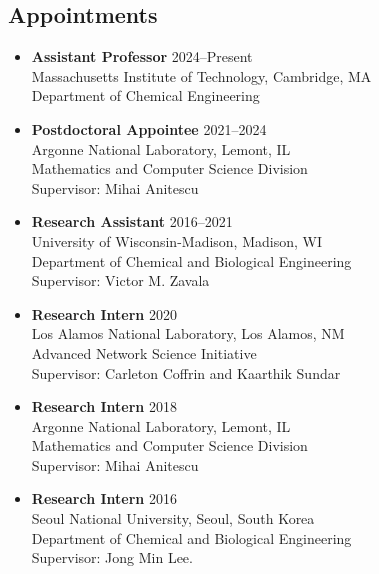 \subsection*{Appointments}
\begin{itemize}[itemsep=1pt, parsep=0pt,leftmargin=*]
\item[] {\bf Assistant Professor} \hfill 2024--Present\\
Massachusetts Institute of Technology, Cambridge, MA\\
Department of Chemical Engineering
\item[] {\bf Postdoctoral Appointee} \hfill 2021--2024\\
  Argonne National Laboratory, Lemont, IL\\
  Mathematics and Computer Science Division \\
  Supervisor: Mihai Anitescu
\item[] {\bf Research Assistant} \hfill 2016--2021\\
  University of Wisconsin-Madison, Madison, WI\\
  Department of Chemical and Biological Engineering \\
  Supervisor: Victor M. Zavala
\item[] {\bf Research Intern} \hfill 2020\\
  Los Alamos National Laboratory, Los Alamos, NM \\
  Advanced Network Science Initiative\\
  Supervisor: Carleton Coffrin and Kaarthik Sundar
\item[] {\bf Research Intern} \hfill 2018\\
  Argonne National Laboratory, Lemont, IL \\
  Mathematics and Computer Science Division \\
  Supervisor: Mihai Anitescu
\item[] {\bf Research Intern} \hfill 2016\\
  Seoul National University, Seoul, South Korea \\
  Department of Chemical and Biological Engineering\\
  Supervisor: Jong Min Lee.
\end{itemize}
